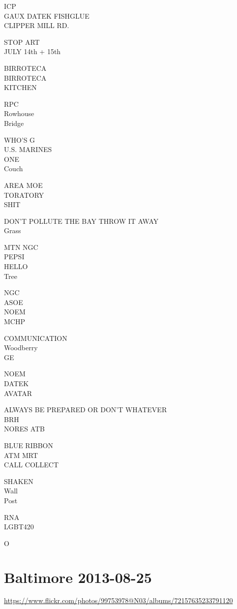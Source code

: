 \documentclass[10pt,letterpaper]{article}
\begin{document}
ICP\\
GAUX DATEK FISHGLUE\\
CLIPPER MILL RD.

STOP ART\\
JULY 14th + 15th

BIRROTECA\\
BIRROTECA\\
KITCHEN

RPC\\
Rowhouse\\
Bridge

WHO'S G\\
U.S. MARINES\\
ONE\\
Couch

AREA MOE\\
TORATORY\\
SHIT

DON'T POLLUTE THE BAY THROW IT AWAY\\
Grass

MTN NGC\\
PEPSI\\
HELLO\\
Tree

NGC\\
ASOE\\
NOEM\\
MCHP

COMMUNICATION\\
Woodberry\\
GE

NOEM\\
DATEK\\
AVATAR

ALWAYS BE PREPARED OR DON'T WHATEVER\\
BRH\\
NORES ATB

BLUE RIBBON\\
ATM MRT\\
CALL COLLECT

SHAKEN\\
Wall\\
Post

RNA\\
LGBT420

O
\pagebreak

\section*{Baltimore 2013-08-25}

\url{https://www.flickr.com/photos/99753978@N03/albums/72157635233791120}
\end{document}
